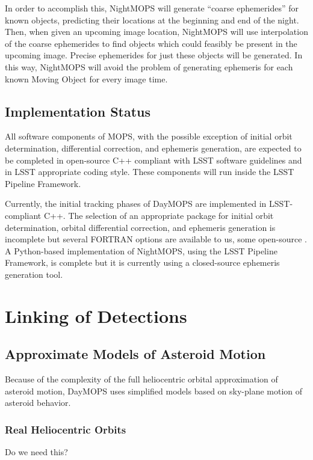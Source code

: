 \documentclass[12pt,preprint]{aastex}
\begin{document}

In order to accomplish this, NightMOPS will generate ``coarse
ephemerides'' for known objects, predicting their locations at the
beginning and end of the night.  Then, when given an upcoming image
location, NightMOPS will use interpolation of the coarse ephemerides
to find objects which could feasibly be present in the upcoming
image. Precise ephemerides for just these objects will be
generated. In this way, NightMOPS will avoid the problem of generating
ephemeris for each known Moving Object for every image time.


\subsection{Implementation Status}

All software components of MOPS, with the possible exception of
initial orbit determination, differential correction, and ephemeris
generation, are expected to be completed in open-source C++ compliant
with LSST software guidelines and in LSST appropriate coding style.
These components will run inside the LSST Pipeline Framework.

Currently, the initial tracking phases of DayMOPS are implemented in
LSST-compliant C++.  The selection of an appropriate package for
initial orbit determination, orbital differential correction, and
ephemeris generation is incomplete but several FORTRAN options are
available to us, some open-source \citep{Milani2006}
\citep{OpenOrb2009}.  A Python-based implementation of NightMOPS,
using the LSST Pipeline Framework, is complete but it is currently
using a closed-source ephemeris generation tool.



\section{Linking of Detections}
\label{linking}

\subsection{Approximate Models of Asteroid Motion}
Because of the complexity of the full heliocentric orbital
approximation of asteroid motion, DayMOPS uses simplified models based
on sky-plane motion of asteroid behavior.  

\subsubsection{Real Heliocentric Orbits}
Do we need this?
\end{document}
